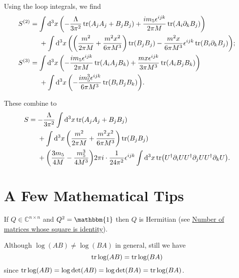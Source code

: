 \documentclass{article}
\begin{document}

Using the loop integrals, we find
\begin{align*}
    S^{(2)} &= \int \dd[3]{x} \qty(-\frac{\Lambda}{3\pi^2} \tr(A_j A_j + B_j B_j) + \frac{im_5 \epsilon^{ijk}}{2\pi M} \tr(A_i \partial_k B_j)) \\
    &\phantom{{}={}} + \int \dd[3]{x} \qty(\qty(\frac{m^2}{2\pi M} + \frac{m^2 x^2}{6\pi M^3})\tr(B_j B_j) - \frac{m^2 x}{6\pi M^3}\epsilon^{ijk} \tr(B_i \partial_k B_j)); \\
    S^{(3)} &= \int \dd[3]{x} \qty(-\frac{i m_5 \epsilon^{ijk}}{2\pi M} \tr(A_i A_j B_k) + \frac{m x \epsilon^{ijk}}{3\pi M^3}\tr(A_i B_j B_k)) \\
    &\phantom{{}={}} + \int \dd[3]{x} \qty(-\frac{i m_5^3 \epsilon^{ijk}}{6\pi M^3}\tr(B_i B_j B_k)).
\end{align*}

These combine to
\begin{align*}
    S &= -\frac{\Lambda}{3\pi^2} \int \dd[3]{x} \tr(A_j A_j + B_j B_j) \\
        &\phantom{{}={}} + \int \dd[3]{x} \qty(\frac{m^2}{2\pi M} + \frac{m^2 x^2}{6\pi M^3})\tr(B_j B_j) \\
        &\phantom{{}={}} + \qty(\frac{3m_5}{4M} - \frac{m_5^3}{4M^3}) 2\pi i \cdot  \frac{1}{24\pi^2} \epsilon^{ijk}  \int \dd[3]{x} \tr(U^\dagger \partial_i U U^\dagger \partial_j U U^\dagger \partial_k U). %
\end{align*}

\section{A Few Mathematical Tips}

If $Q\in \mathbb{C}^{n\times n}$ and $Q^2 = \mathbbm{1}$ then $Q$ is Hermitian (see \href{https://math.stackexchange.com/questions/219565/number-of-matrices-whose-square-is-identity}{Number of matrices whose square is identity}).

\par

Although $\log (AB) \neq \log (BA)$ in general, still we have
\[ \tr \log (AB) = \tr \log (BA) \]
since $\tr \log (AB) = \log \det(AB) = \log \det(BA) = \tr\log(BA)$.
\end{document}
